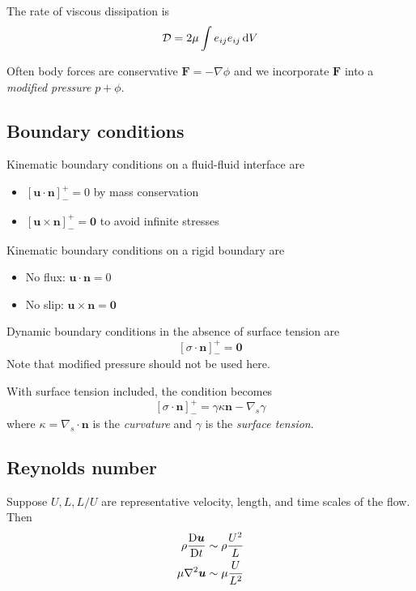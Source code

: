 \documentclass{jknotes}
\begin{document}
The rate of viscous dissipation is
\begin{equation}
	\mathcal{D} = 2 \mu \int e_{ij} e_{ij} \, \diffd{V}
\end{equation}

Often body forces are conservative $\bm{F} = -\nabla \phi$ and we incorporate
$\bm{F}$ into a \emph{modified pressure} $p + \phi$.

\subsection{Boundary conditions}
Kinematic boundary conditions on a fluid-fluid interface are
\begin{itemize}
	\item $\left[ \bm{u} \cdot \bm{n} \right]^+_- = 0$ by mass conservation
	\item $\left[ \bm{u} \times \bm{n} \right]^+_- = \bm{0}$ to avoid infinite
		stresses
\end{itemize}

Kinematic boundary conditions on a rigid boundary are
\begin{itemize}
	\item No flux: $\bm{u} \cdot \bm{n} = 0$
	\item No slip: $\bm{u} \times \bm{n} = \bm{0}$
\end{itemize}

Dynamic boundary conditions in the absence of surface tension are 
\begin{equation}
	\left[\sigma \cdot \bm{n}\right]^+_- = \bm{0}
\end{equation}
Note that modified pressure should not be used here.

With surface tension included, the condition becomes
\begin{equation}
	\left[ \sigma \cdot \bm{n} \right]^+_- = \gamma \kappa \bm{n} - \nabla_s
	\gamma
\end{equation}
where $\kappa = \nabla_s \cdot \bm{n}$ is the \emph{curvature} and $\gamma$ is
the \emph{surface tension}.

\subsection{Reynolds number}
Suppose $U, L, L/U$ are representative velocity, length, and time scales of
the flow. Then
\begin{equation}
	\begin{aligned}
		\rho \frac{\mathrm{D}{\bm{u}}}{\mathrm{D}{t}} &\sim \rho \frac{U^2}{L} \\
		\mu \nabla^2 \bm{u} &\sim \mu \frac{U}{L^2}
	\end{aligned}
\end{equation}
\end{document}
